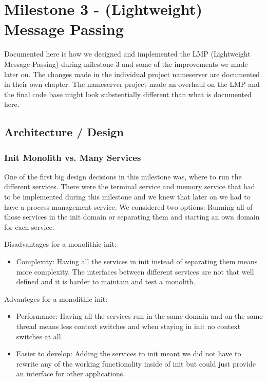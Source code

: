 \chapter{Milestone 3 - (Lightweight) Message Passing}

Documented here is how we designed and implemented the LMP (Lightweight Message Passing) during milestone 3 and some of the improvements we made later on. The changes made in the individual project nameserver are documented in their own chapter. The nameserver project made an overhaul on the LMP and the final code base might look substentially different than what is documented here.

\section{Architecture / Design}

\subsection{Init Monolith vs. Many Services}

One of the first big design decisions in this milestone was, where to run the different services. There were the terminal service and memory service that had to be implemented during this milestone and we knew that later on we had to have a process management service. We considered two options: Running all of those services in the init domain or separating them and starting an own domain for each service.

Disadvantages for a monolithic init:
\begin{itemize}
    \item Complexity: Having all the services in init instead of separating them means more complexity. The interfaces between different services are not that well defined and it is harder to maintain and test a monolith.
\end{itemize}

Advanteges for a monolithic init:
\begin{itemize}
    \item Performance: Having all the services run in the same domain and on the same thread means less context switches and when staying in init no context switches at all.
    \item Easier to develop: Adding the services to init meant we did not have to rewrite any of the working functionality inside of init but could just provide an interface for other applications.
\end{itemize}

